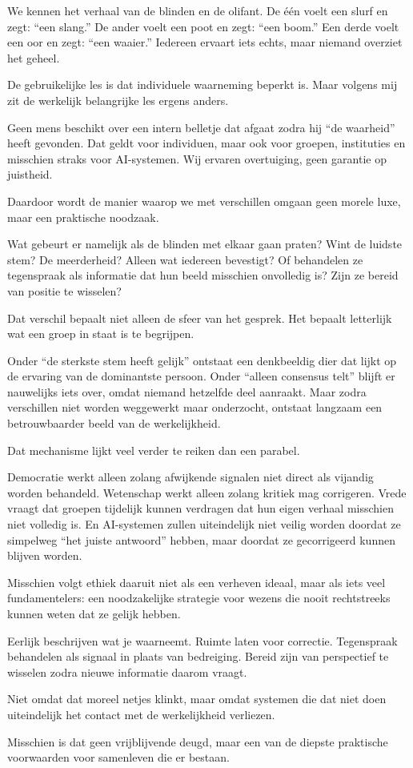 \documentclass{article}
\begin{document}
We kennen het verhaal van de blinden en de olifant. De één voelt een slurf en zegt: ``een slang.'' De ander voelt een poot en zegt: ``een boom.'' Een derde voelt een oor en zegt: ``een waaier.'' Iedereen ervaart iets echts, maar niemand overziet het geheel.

De gebruikelijke les is dat individuele waarneming beperkt is. Maar volgens mij zit de werkelijk belangrijke les ergens anders.

Geen mens beschikt over een intern belletje dat afgaat zodra hij ``de waarheid'' heeft gevonden. Dat geldt voor individuen, maar ook voor groepen, instituties en misschien straks voor AI-systemen. Wij ervaren overtuiging, geen garantie op juistheid.

Daardoor wordt de manier waarop we met verschillen omgaan geen morele luxe, maar een praktische noodzaak.

Wat gebeurt er namelijk als de blinden met elkaar gaan praten? Wint de luidste stem? De meerderheid? Alleen wat iedereen bevestigt? Of behandelen ze tegenspraak als informatie dat hun beeld misschien onvolledig is? Zijn ze bereid van positie te wisselen?

Dat verschil bepaalt niet alleen de sfeer van het gesprek. Het bepaalt letterlijk wat een groep in staat is te begrijpen.

Onder ``de sterkste stem heeft gelijk'' ontstaat een denkbeeldig dier dat lijkt op de ervaring van de dominantste persoon. Onder ``alleen consensus telt'' blijft er nauwelijks iets over, omdat niemand hetzelfde deel aanraakt. Maar zodra verschillen niet worden weggewerkt maar onderzocht, ontstaat langzaam een betrouwbaarder beeld van de werkelijkheid.

Dat mechanisme lijkt veel verder te reiken dan een parabel.

Democratie werkt alleen zolang afwijkende signalen niet direct als vijandig worden behandeld. Wetenschap werkt alleen zolang kritiek mag corrigeren. Vrede vraagt dat groepen tijdelijk kunnen verdragen dat hun eigen verhaal misschien niet volledig is. En AI-systemen zullen uiteindelijk niet veilig worden doordat ze simpelweg ``het juiste antwoord'' hebben, maar doordat ze gecorrigeerd kunnen blijven worden.

Misschien volgt ethiek daaruit niet als een verheven ideaal, maar als iets veel fundamentelers: een noodzakelijke strategie voor wezens die nooit rechtstreeks kunnen weten dat ze gelijk hebben.

Eerlijk beschrijven wat je waarneemt. Ruimte laten voor correctie. Tegenspraak behandelen als signaal in plaats van bedreiging. Bereid zijn van perspectief te wisselen zodra nieuwe informatie daarom vraagt.

Niet omdat dat moreel netjes klinkt, maar omdat systemen die dat niet doen uiteindelijk het contact met de werkelijkheid verliezen.

Misschien is dat geen vrijblijvende deugd, maar een van de diepste praktische voorwaarden voor samenleven die er bestaan.
\end{document}
